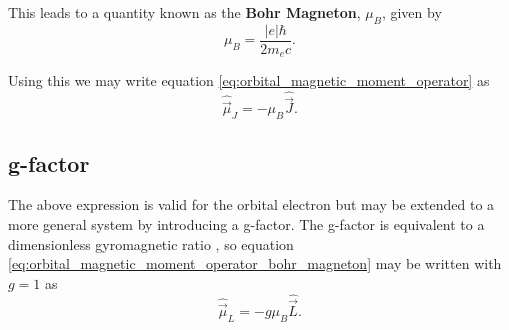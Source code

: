 This leads to a quantity known as the \textbf{Bohr Magneton}, $\mu_B$, given by 
\begin{equation}
    \mu_B = \frac{|e|\hbar}{2m_e c}.
    \label{eq:bohr_magneton}
\end{equation}

Using this we may write equation \ref{eq:orbital_magnetic_moment_operator} as 
\begin{equation}
    \hat{\vec{\mu}}_J = -\mu_B\hat{\vec{J}}. 
    \label{eq:orbital_magnetic_moment_operator_bohr_magneton}
\end{equation}





\subsection{g-factor}
The above expression is valid for the orbital electron but may be extended to a more general system by introducing a g-factor. The g-factor is equivalent to a dimensionless gyromagnetic ratio \cite{giancoli2008physics}, so equation \ref{eq:orbital_magnetic_moment_operator_bohr_magneton} may be written with $g=1$ as 
\begin{equation}
    \hat{\vec{\mu}}_L = -g\mu_B\hat{\vec{L}}. 
    \label{eq:orbital_magnetic_moment_operator_bohr_magneton_g_factor}
\end{equation}


